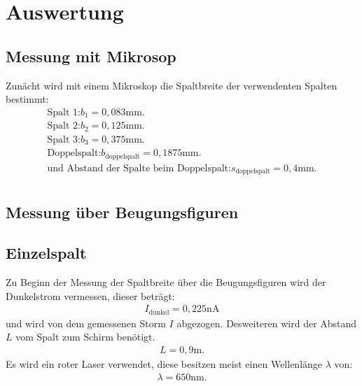 \section{Auswertung}
\label{sec:Auswertung}
\subsection{Messung mit Mikrosop}
Zunächt wird mit einem Mikroskop die Spaltbreite der verwendenten
Spalten bestimmt:
\begin{align*}
  \text{Spalt 1:}  b_1= 0,083\si{\milli\meter}.\\
  \text{Spalt 2:}  b_2= 0,125\si{\milli\meter}.\\
  \text{Spalt 3:}  b_3= 0,375\si{\milli\meter}.\\
\text{Doppelspalt:} b_\mathrm{doppelspalt}=0,1875\si{\milli\meter}.\\
\text{und Abstand der Spalte beim Doppelspalt:} s_\mathrm{doppelspalt}=0,4\si{\milli\meter}.\\
\end{align*}
\subsection{Messung über Beugungsfiguren}
\subsection{Einzelspalt}
\label{sec:einzel}

Zu Beginn der Messung der Spaltbreite über die Beugungsfiguren wird der Dunkelstrom vermessen, dieser beträgt:
\begin{align*}
  I_\mathrm{dunkel}= 0,225\si{\nano\ampere}
\end{align*}
und wird von dem gemessenen Storm $I$ abgezogen.
Desweiteren wird der Abstand $L$ vom Spalt zum Schirm benötigt.
\begin{align*}
  L=0,9\si{\meter}.
\end{align*}
Es wird ein roter Laser verwendet, diese besitzen meist einen Wellenlänge $\lambda$ von:
\begin{align*}
  \lambda=650\si{\nano\meter}.
\end{align*}


